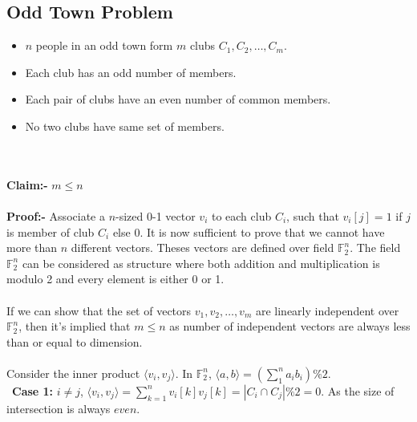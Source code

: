 \subsection{Odd Town Problem}
\begin{itemize}
    \item $n$ people in an odd town form $m$ clubs $C_1, C_2, \hdots, C_m$.
    \item Each club has an odd number of members.
    \item Each pair of clubs have an even number of common members.
    \item No two clubs have same set of members.
\end{itemize}\\\\
\textbf{Claim:-} $m \le n$\\\\
\textbf{Proof:-} Associate a $n$-sized 0-1 vector $v_i$ to each club $C_i$, such that $v_i[j]=1$ if $j$ is member of club $C_i$ else 0. It is now sufficient to prove that we cannot have more than $n$ different vectors. Theses vectors are defined over field $\mathbb{F}_2^n$. The field $\mathbb{F}_2^n$ can be considered as structure where both addition and multiplication is modulo 2 and every element is either 0 or 1.\\\\
If we can show that the set of vectors $v_1, v_2, \hdots, v_m$ are linearly independent over $\mathbb{F}_2^n$, then it's implied that $m \le n$ as number of independent vectors are always less than or equal to dimension.\\\\
Consider the inner product $\langle v_i,v_j\rangle$. In $\mathbb{F}_2^n$, $\langle a,b\rangle = (\sum_{1}^{n} a_ib_i)\%2$.\\

~\textbf{Case 1:} $i\neq j$, $\langle v_i,v_j\rangle = \sum_{k=1}^{n} v_i[k]v_j[k] = | C_i \cap C_j |\%2 = 0$. As the size of intersection is always $even$.\\

